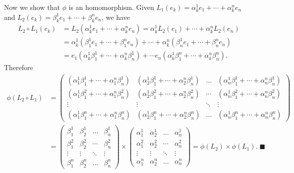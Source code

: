 \documentclass[../Project.tex]{subfiles}
\begin{document}
\begin{proo*}
	Now we show that $\phi$ is an homomorphism. Given $L_1(e_k) = \alpha^1_ke_1 + \cdots + \alpha^n_ke_n$ and $L_2(e_k) = \beta^1_ke_1 + \cdots + \beta^n_ke_n$, we have
	\begin{align*}
	L_2 \circ L_1(e_k) &= L_2(\alpha^1_ke_1 + \cdots + \alpha^n_ke_n) = \alpha_k^1L_2(e_1) + \cdots + \alpha_k^nL_2(e_n)\\
	&= \alpha^1_k(\beta^1_1e_1 + \cdots + \beta^n_1e_n) + \cdots + \alpha^n_k(\beta^1_ne_1 + \cdots + \beta^n_ne_n)\\
	&= e_1(\alpha^1_k\beta^1_1 + \cdots + \alpha^n_k\beta^1_n) + \cdots e_n(\alpha^1_k\beta^n_1 + \cdots +\alpha^n_k\beta^n_n).
	\end{align*}
	Therefore
	\begin{align*}
		\phi(L_2 \circ L_1) &= 
		\begin{pmatrix} 
	    (\alpha^1_1\beta^1_1 + \cdots +\alpha^n_1\beta^1_n) & (\alpha^1_2\beta^1_1 + \cdots + \alpha^n_2\beta^1_n) & \dots & (\alpha^1_n\beta^1_1 + \cdots +\alpha^n_n\beta^1_n) \\
	    (\alpha^1_1\beta^2_1 + \cdots +\alpha^n_1\beta^2_n) & (\alpha^1_2\beta^2_1 + \cdots + \alpha^n_2\beta^2_n) & \cdots & (\alpha^1_n\beta^2_1 + \cdots +\alpha^n_n\beta^2_n) \\
	    \vdots & \vdots& \ddots & \vdots\\
	    (\alpha^1_1\beta^n_1 + \cdots +\alpha^n_1\beta^n_n) & (\alpha^1_2\beta^n_1 + \cdots + \alpha^n_2\beta^n_n) &\dots & (\alpha^1_n\beta^n_1 + \cdots +\alpha^n_n\beta^n_n) 
		\end{pmatrix}\\
		&= \begin{pmatrix} 
	    \beta^1_1 & \beta^1_2 & \dots & \beta^1_n \\
	    \beta^2_1 & \beta^2_2 & \cdots & \beta^2_n \\
	    \vdots & \vdots& \ddots & \vdots\\
	    \beta^n_1 & \beta^n_2  &\dots & \beta^n_n 
	\end{pmatrix} \times
\begin{pmatrix} 
	    \alpha^1_1 & \alpha^1_2 & \dots & \alpha^1_n \\
	    \alpha^2_1 & \alpha^2_2 & \cdots & \alpha^2_n \\
	    \vdots & \vdots& \ddots & \vdots\\
	    \alpha^n_1 & \alpha^n_2  &\dots & \alpha^n_n 
	\end{pmatrix}
		= \phi(L_2) \times \phi(L_1). \;\blacksquare
	\end{align*}
\end{proo*}
\end{document}
